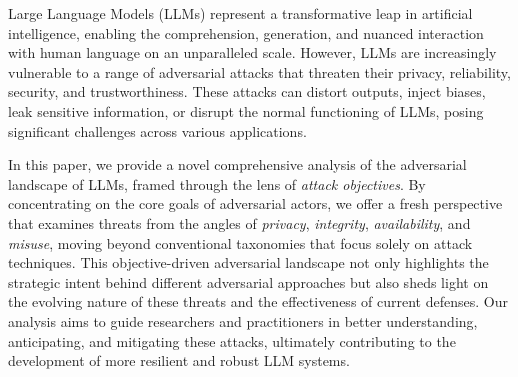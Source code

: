 Large Language Models (LLMs) represent a transformative leap in artificial intelligence, enabling the comprehension, generation, and nuanced interaction with human language on an unparalleled scale. However, LLMs are increasingly vulnerable to a range of adversarial attacks that threaten their privacy, reliability, security, and trustworthiness. These attacks can distort outputs, inject biases, leak sensitive information, or disrupt the normal functioning of LLMs, posing significant challenges across various applications. 

In this paper, we provide a novel comprehensive analysis of the adversarial landscape of LLMs, framed through the lens of {\em attack objectives}. By concentrating on the core goals of adversarial actors, we offer a fresh perspective that examines threats from the angles of {\em privacy}, {\em integrity}, {\em availability}, and {\em misuse}, moving beyond conventional taxonomies that focus solely on attack techniques. This objective-driven adversarial landscape not only highlights the strategic intent behind different adversarial approaches but also sheds light on the evolving nature of these threats and the effectiveness of current defenses. Our analysis aims to guide researchers and practitioners in better understanding, anticipating, and mitigating these attacks, ultimately contributing to the development of more resilient and robust LLM systems.




